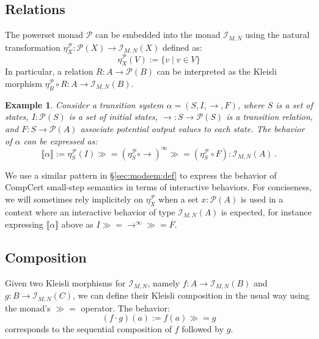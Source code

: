\documentclass{article}
\newtheorem{example}{Example}
\newcommand{\bind}{\gg\!\!=}
\begin{document}

\subsection{Relations} %

The powerset monad $\mathcal{P}$
can be embedded into the monad $\mathcal{I}_{M,N}$
using the natural transformation
$\eta^\mathcal{P}_X : \mathcal{P}(X) \rightarrow \mathcal{I}_{M,N}(X)$
defined as:
\[
    \eta^\mathcal{P}_X(V) := \{ v \mid v \in V \}
\]
In particular,
a relation $R : A \rightarrow \mathcal{P}(B)$
can be interpreted as the Kleisli morphism
$\eta^\mathcal{P}_B \circ R : A \rightarrow \mathcal{I}_{M,N}(B)$.

\begin{example} \label{ex:ts}
Consider a transition system $\alpha = (S, I, {\rightarrow}, F)$,
where
$S$ is a set of states,
$I : \mathcal{P}(S)$
is a set of initial states,
${\rightarrow} : S \rightarrow \mathcal{P}(S)$
is a transition relation, and
$F : S \rightarrow \mathcal{P}(A)$
associate potential output values to each state.
The behavior of $\alpha$ can be expressed as:
\[
    \llbracket \alpha \rrbracket :=
    \eta^\mathcal{P}_S(I) \bind
    (\eta^\mathcal{P}_S \circ {\rightarrow})^\infty \bind
    (\eta^\mathcal{P}_S \circ F)
    : \mathcal{I}_{M,N}(A) \,.
\]
\end{example}

We use a similar pattern in \S\ref{sec:modsem:def}
to express the behavior of CompCert small-step semantics
in terms of interactive behaviors.
For conciseness,
we will sometimes rely implicitely on $\eta_X^\mathcal{P}$
when a set $x : \mathcal{P}(A)$ is used
in a context where an interactive behavior
of type $\mathcal{I}_{M,N}(A)$ is expected,
for instance expressing $\llbracket \alpha \rrbracket$ above as
$I \bind {\rightarrow}^\infty \bind F$.


\subsection{Composition} \label{sec:monad:subst} %

Given two Kleisli morphisms for $\mathcal{I}_{M,N}$,
namely
$f : A \rightarrow \mathcal{I}_{M,N}(B)$ and
$g : B \rightarrow \mathcal{I}_{M,N}(C)$,
we can define their Kleisli composition
in the usual way using the monad's $\bind$ operator.
The behavior:
\[
    (f \cdot g)(a) := f(a) \bind g
\]
corresponds to the sequential composition of $f$ followed by $g$.
\end{document}

